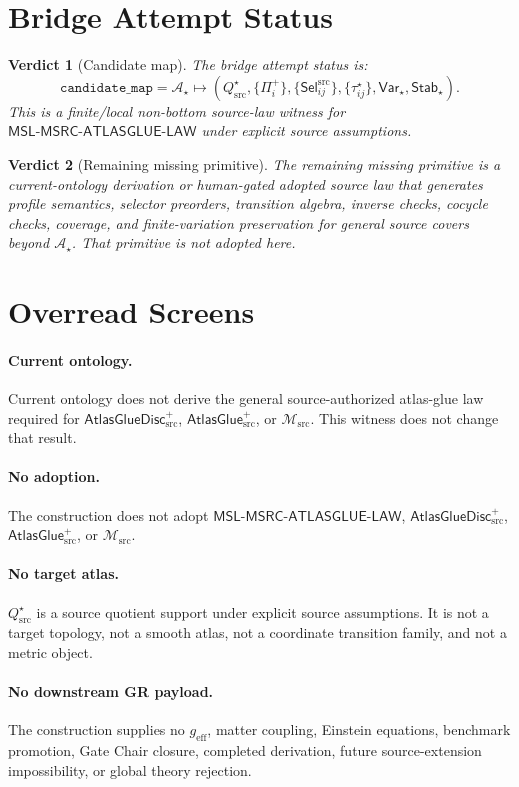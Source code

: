 \documentclass[11pt]{article}
\newcommand{\Msrc}{\mathcal{M}_{\mathrm{src}}}
\newcommand{\geff}{g_{\mathrm{eff}}}
\newcommand{\AtlasGlue}{\mathsf{AtlasGlue}_{\mathrm{src}}^{+}}
\newcommand{\AtlasGlueDisc}{\mathsf{AtlasGlueDisc}_{\mathrm{src}}^{+}}
\newcommand{\MSL}{\mathsf{MSL}\mbox{-}\mathsf{MSRC}\mbox{-}\mathsf{ATLASGLUE}\mbox{-}\mathsf{LAW}}
\newcommand{\Prof}{\Pi^{+}}
\newcommand{\Sel}{\mathsf{Sel}^{\mathrm{src}}}
\newcommand{\Qstar}{Q_{\mathrm{src}}^{\star}}
\newcommand{\Astar}{\mathcal A_{\star}}
\newcommand{\Varstar}{\mathsf{Var}_{\star}}
\newcommand{\Stabstar}{\mathsf{Stab}_{\star}}
\newtheorem{verdict}{Verdict}
\begin{document}
\section{Bridge Attempt Status}

\begin{verdict}[Candidate map]
The bridge attempt status is:
\[
\texttt{candidate\_map} =
\Astar \mapsto
(\Qstar,\{\Prof_i\},\{\Sel_{ij}\},\{\tau_{ij}^{\star}\},\Varstar,\Stabstar).
\]
This is a finite/local non-bottom source-law witness for \(\MSL\) under
explicit source assumptions.
\end{verdict}

\begin{verdict}[Remaining missing primitive]
The remaining missing primitive is a current-ontology derivation or
human-gated adopted source law that generates profile semantics, selector
preorders, transition algebra, inverse checks, cocycle checks, coverage, and
finite-variation preservation for general source covers beyond \(\Astar\).
That primitive is not adopted here.
\end{verdict}

\section{Overread Screens}

\paragraph{Current ontology.}
Current ontology does not derive the general source-authorized atlas-glue law
required for \(\AtlasGlueDisc\), \(\AtlasGlue\), or \(\Msrc\). This witness
does not change that result.

\paragraph{No adoption.}
The construction does not adopt \(\MSL\), \(\AtlasGlueDisc\), \(\AtlasGlue\),
or \(\Msrc\).

\paragraph{No target atlas.}
\(\Qstar\) is a source quotient support under explicit source assumptions. It
is not a target topology, not a smooth atlas, not a coordinate transition
family, and not a metric object.

\paragraph{No downstream GR payload.}
The construction supplies no \(\geff\), matter coupling, Einstein equations,
benchmark promotion, Gate Chair closure, completed derivation, future
source-extension impossibility, or global theory rejection.
\end{document}

